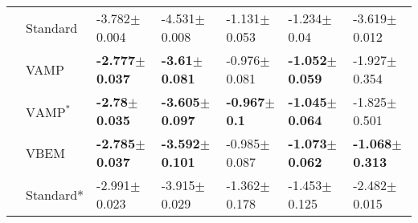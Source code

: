 \begin{tabular}{lllllll}
             & Standard &           -3.782$\pm$0.004 &           -4.531$\pm$0.008 &          -1.131$\pm$0.053 &            -1.234$\pm$0.04 &           -3.619$\pm$0.012 \\
             & VAMP &  \textbf{-2.777$\pm$0.037} &   \textbf{-3.61$\pm$0.081} &          -0.976$\pm$0.081 &  \textbf{-1.052$\pm$0.059} &           -1.927$\pm$0.354 \\
             & $\text{VAMP}^*$ &   \textbf{-2.78$\pm$0.035} &  \textbf{-3.605$\pm$0.097} &   \textbf{-0.967$\pm$0.1} &  \textbf{-1.045$\pm$0.064} &           -1.825$\pm$0.501 \\
             & VBEM &  \textbf{-2.785$\pm$0.037} &  \textbf{-3.592$\pm$0.101} &          -0.985$\pm$0.087 &  \textbf{-1.073$\pm$0.062} &  \textbf{-1.068$\pm$0.313} \\
             & Standard* &           -2.991$\pm$0.023 &           -3.915$\pm$0.029 &          -1.362$\pm$0.178 &           -1.453$\pm$0.125 &           -2.482$\pm$0.015 \\
\bottomrule
\end{tabular}

